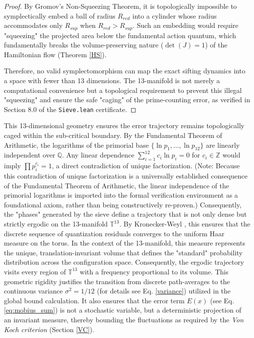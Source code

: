 \documentclass[sn-mathphys-num, pdflatex, referee]{sn-jnl}
\begin{document}
\begin{proof}
By Gromov's Non-Squeezing Theorem, it is topologically impossible to symplectically embed a ball of radius $R_{red}$ into a cylinder whose radius accommodates only $R_{sup}$ when $R_{red} > R_{sup}$. Such an embedding would require "squeezing" the projected area below the fundamental action quantum, which fundamentally breaks the volume-preserving nature ($\det(J)=1$) of the Hamiltonian flow (Theorem \ref{HS}). 

Therefore, no valid symplectomorphism can map the exact sifting dynamics into a space with fewer than 13 dimensions. The 13-manifold is not merely a computational convenience but a topological requirement to prevent this illegal "squeezing" and ensure the safe "caging" of the prime-counting error, as verified in Section 8.0 of the \texttt{Sieve.lean} certificate.
\end{proof}
This 13-dimensional geometry ensures the error trajectory remains topologically caged within the sub-critical boundary. By the Fundamental Theorem of Arithmetic, the logarithms of the primorial base $\{\ln p_1, \dots, \ln p_{12}\}$ are linearly independent over $\mathbb{Q}$. Any linear dependence $\sum_{i=1}^{12} c_i \ln p_i = 0$ for $c_i \in \mathbb{Z}$ would imply $\prod p_i^{c_i} = 1$, a direct contradiction of unique factorization. (Note: Because this contradiction of unique factorization is a universally established consequence of the Fundamental Theorem of Arithmetic, the linear independence of the primorial logarithms is imported into the formal verification environment as a foundational axiom, rather than being constructively re-proven.) Consequently, the "phases" generated by the sieve define a trajectory that is not only dense but strictly ergodic on the 13-manifold $\mathbb{T}^{13}$. By Kronecker-Weyl \cite{weyl}, this ensures that the discrete sequence of quantization residuals converges to the uniform Haar measure on the torus. In the context of the 13-manifold, this measure represents the unique, translation-invariant volume that defines the "standard" probability distribution across the configuration space. Consequently, the ergodic trajectory visits every region of $\mathbb{T}^{13}$ with a frequency proportional to its volume. This geometric rigidity justifies the transition from discrete path-averages to the continuous variance $\sigma^2 = 1/12$ (for details see Eq. \ref{variance}) utilized in the global bound calculation. It also ensures that the error term $E(x)$ (see Eq. \ref{eq:mobius_sum}) is not a stochastic variable, but a deterministic projection of an invariant measure, thereby bounding the fluctuations as required by the \textit{Von Koch criterion} (Section \ref{VC}).
\end{document}
